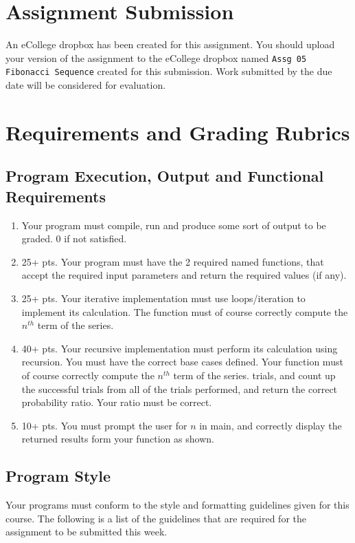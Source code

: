 \documentclass[11pt]{article}
\begin{document}
\section*{Assignment Submission}
\label{sec-4}


An eCollege dropbox has been created for this assignment.  You should
upload your version of the assignment to the eCollege dropbox named
\verb~Assg 05 Fibonacci Sequence~ created for this submission.  Work
submitted by the due date will be considered for evaluation.
\section*{Requirements and Grading Rubrics}
\label{sec-5}
\subsection*{Program Execution, Output and Functional Requirements}
\label{sec-5-1}


\begin{enumerate}
\item Your program must compile, run and produce some sort of output to be
  graded. 0 if not satisfied.
\item 25+ pts.  Your program must have the 2 required named functions,
   that accept the required input parameters and return the required
   values (if any).
\item 25+ pts. Your iterative implementation must use loops/iteration to implement
   its calculation.  The function must of course correctly compute the $n^{th}$
   term of the series.
\item 40+ pts. Your recursive implementation must perform its calculation using
   recursion.  You must have the correct base cases defined.  Your function must
   of course correctly compute the $n^{th}$ term of the series.
   trials, and count up the successful trials from all of the trials performed,
   and return the correct probability ratio.  Your ratio must be correct.
\item 10+ pts. You must prompt the user for $n$ in main, and correctly display
   the returned results form your function as shown.
\end{enumerate}
\subsection*{Program Style}
\label{sec-5-2}


Your programs must conform to the style and formatting guidelines
given for this course.  The following is a list of the guidelines that
are required for the assignment to be submitted this week.
\end{document}
